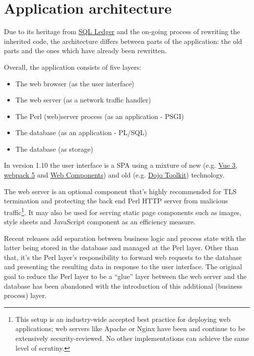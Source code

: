 \section{Application architecture}
\label{sec-ledgersmb-architecture}

Due to its heritage from \href{https://sql-ledger.com/}{SQL Ledger} and the on-going process of rewriting
the inherited code, the architecture differs between parts
of the application: the old parts and the ones which have already been
rewritten.

Overall, the application consists of five layers:

\begin{itemize}
\item The web browser (as the user interface)
\item The web server (as a network traffic handler)
\item The Perl (web)server process (as an application - \gls{PSGI})
\item The database (as an application - \gls{PL/SQL})
\item The database (as storage)
\end{itemize}

In version 1.10 the user interface is a \gls{SPA} using a mixture of new (e.g. 
\href{https://vuejs.org/}{Vue 3},
\href{https://webpack.js.org/}{webpack 5} and \href{https://developer.mozilla.org/en-US/docs/Web/Web_Components}{Web Components}) and old (e.g. \href{https://dojotoolkit.org/}{Dojo Toolkit}) technology.

The web server is an optional component that's highly recommended for TLS termination
and protecting the back end Perl HTTP server from malicious traffic\footnote{This setup is an industry-wide accepted best practice for deploying web applications; web servers like Apache or Nginx have been and continue to be extensively security-reviewed. No other implementations can achieve the same level of scrutiny.}. It may also be used
for serving static page components such as images, style sheets and JavaScript component as an efficiency measure.

Recent releases add separation between business logic and process state with the
latter being stored in the database and managed at the Perl layer.  Other than that, it's the Perl layer's responsibility to forward web requests to the database and
presenting the resulting data in response to the user interface.
The original goal to reduce the Perl layer to be a ``glue'' layer between the web
server and the database has been abandoned with  the introduction of this additional
(business process) layer.


